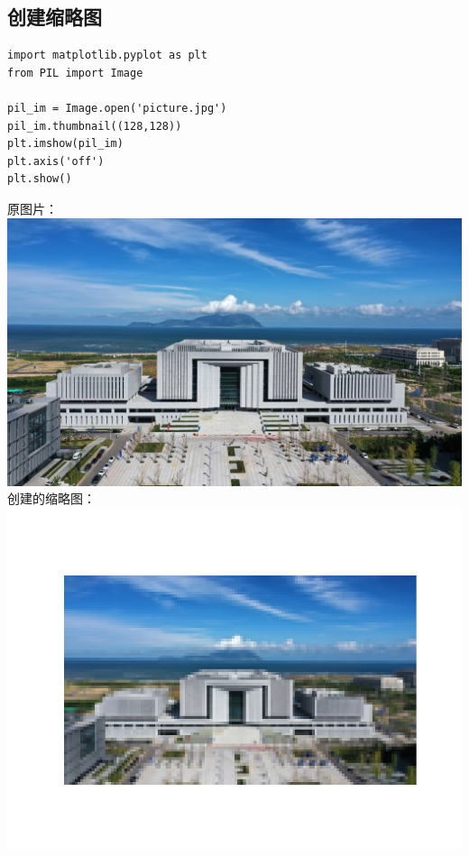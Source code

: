 \documentclass[UTF8,a4paper]{ctexart}
\begin{document}
\subsection{创建缩略图}
\begin{lstlisting}
import matplotlib.pyplot as plt
from PIL import Image

pil_im = Image.open('picture.jpg')
pil_im.thumbnail((128,128))
plt.imshow(pil_im)
plt.axis('off')
plt.show()
\end{lstlisting}
原图片：\\
\includegraphics[width=1\textwidth]{./python/picture.jpg}\\
创建的缩略图：\\
\includegraphics[width=1\textwidth]{./python/缩略图.png}
\end{document}
